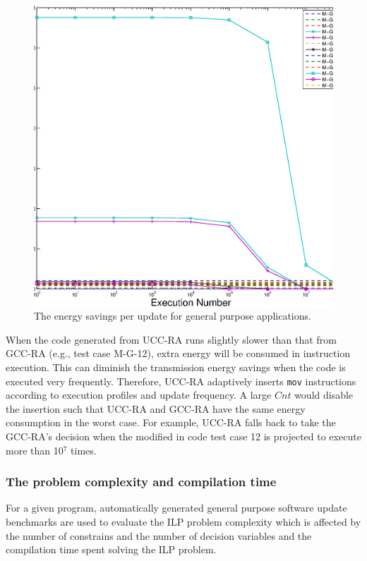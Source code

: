 \begin{figure}[htbp]
\centering
\includegraphics[scale=0.45]{figures/energy.eps}
\caption{The energy savings per update for general purpose applications.}
\label{fexp.energy}
\end{figure}

When the code generated from UCC-RA runs slightly slower than that from GCC-RA (e.g., test case M-G-12), extra energy 
will be consumed in instruction execution. This can diminish the transmission energy savings when the code is executed 
very frequently. Therefore, UCC-RA adaptively inserts {\tt mov} instructions according to execution profiles and update 
frequency. A large $Cnt$ would disable the insertion such that UCC-RA and GCC-RA have the same energy consumption in 
the worst case. For example, UCC-RA falls back to take the GCC-RA's decision when the modified in code test case 12 is 
projected to execute more than 10$^7$ times.



\subsubsection{The problem complexity and compilation time}
For a given program, automatically generated general purpose software update
benchmarks are used to evaluate the ILP problem
complexity which is affected by the number of constrains and the number of
decision variables and the compilation time spent solving the ILP problem.

